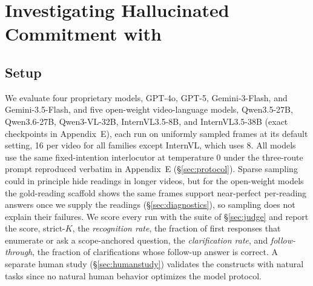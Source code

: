 \section{Investigating Hallucinated Commitment with \bench{}}
\label{sec:experiments}

\subsection{Setup}
\label{sec:setup}

We evaluate four proprietary models, GPT-4o, GPT-5, Gemini-3-Flash, and Gemini-3.5-Flash, and five open-weight video-language models, Qwen3.5-27B, Qwen3.6-27B, Qwen3-VL-32B, InternVL3.5-8B, and InternVL3.5-38B (exact checkpoints in Appendix~E), each run on uniformly sampled frames at its default setting, 16 per video for all families except InternVL, which uses 8. All models use the same fixed-intention interlocutor at temperature 0 under the three-route prompt reproduced verbatim in Appendix~E (\S\ref{sec:protocol}). Sparse sampling could in principle hide readings in longer videos, but for the open-weight models the gold-reading scaffold shows the same frames support near-perfect per-reading answers once we supply the readings (\S\ref{sec:diagnostics}), so sampling does not explain their failures. We score every run with the suite of \S\ref{sec:judge} and report the \bench{} score, strict-$K$, the \textit{recognition rate}, the fraction of first responses that enumerate or ask a scope-anchored question, the \textit{clarification rate}, and \textit{follow-through}, the fraction of clarifications whose follow-up answer is correct. A separate human study (\S\ref{sec:humanstudy}) validates the constructs with natural tasks since no natural human behavior optimizes the model protocol.

